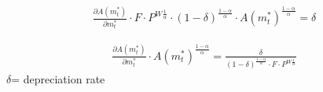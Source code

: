 \documentclass[12pt]{article}
\begin{document}
\begin{equation}
\begin{aligned}
\frac{\partial A(m^\ast_t)}{\partial m^\ast_t} \cdot F \cdot P^{W\frac{1}{\alpha}}\cdot(1-\delta)^\frac{1-\alpha}{\alpha}\cdot A(m^\ast_t)^\frac{1-\alpha}{\alpha}=\delta
\end{aligned}
\end{equation}

\begin{equation}
\begin{aligned}
\frac{\partial A(m^\ast_t)}{\partial m^\ast_t} \cdot A(m^\ast_t)^\frac{1-\alpha}{\alpha}=\frac{\delta}{(1-\delta)^{\frac{1-\alpha}{\alpha}}\cdot F\cdot P^{W\frac{1}{\alpha}}}
\end{aligned}
\end{equation}
\[
\]
\normalsize
$\delta$= depreciation rate
\end{document}

